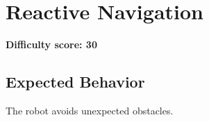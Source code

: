 \section{Reactive Navigation}

\textbf{Difficulty score: 30}

\subsection{Expected Behavior}
The robot avoids unexpected obstacles.



